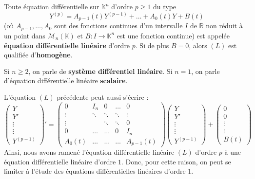 
  \begin{definition}
    Toute équation différentielle sur $\mathbb{K}^n$ d'ordre $p \geq 1$ du type
    \[ Y^{(p)} = A_{p-1}(t) Y^{(p-1)} + \dots + A_0(t) Y + B(t) \tag{$L$} \]
    (où $A_{p-1}, \dots, A_0$ sont des fonctions continues d'un intervalle $I$ de $\mathbb{R}$ non réduit à un point dans $\mathcal{M}_n(\mathbb{K})$ et $B : I \rightarrow \mathbb{K}^n$ est une fonction continue) est appelée \textbf{équation différentielle linéaire} d'ordre $p$.
    \newpar
    Si de plus $B = 0$, alors $(L)$ est qualifiée d'\textbf{homogène}.
  \end{definition}

  \begin{definition}
    Si $n \geq 2$, on parle de \textbf{système différentiel linéaire}. Si $n = 1$, on parle d'équation différentielle linéaire \textbf{scalaire}.
  \end{definition}

  \begin{remark}
    L'équation $(L)$ précédente peut aussi s'écrire :
    \[ \begin{pmatrix} Y \\ Y' \\ \vdots \\ \vdots \\ Y^{(p-1)} \end{pmatrix}' = \begin{pmatrix} 0 & I_n & 0 & \dots & 0 \\ \vdots & \ddots & \ddots & \ddots & \vdots \\ \vdots &  & \ddots & \ddots & 0 \\ 0 & \dots & \dots & 0 & I_n \\ A_0(t) & \dots & \dots & \dots & A_{p-1}(t) \end{pmatrix} \begin{pmatrix} Y \\ Y' \\ \vdots \\ \vdots \\ Y^{(p-1)} \end{pmatrix} + \begin{pmatrix} 0 \\ 0 \\ \vdots \\ \vdots \\ B(t) \end{pmatrix} \]
    Ainsi, nous avons ramené l'équation différentielle linéaire $(L)$ d'ordre $p$ à une équation différentielle linéaire d'ordre $1$. Donc, pour cette raison, on peut se limiter à l'étude des équations différentielles linéaires d'ordre $1$.
  \end{remark}

